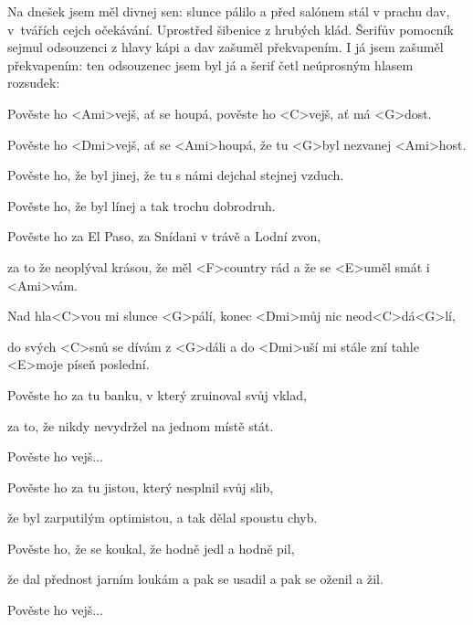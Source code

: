 

Na dnešek jsem měl divnej sen: slunce pálilo a před salónem stál v prachu dav, v~tvářích cejch očekávání.
Uprostřed šibenice z hrubých klád.
Šerifův pomocník sejmul odsouzenci z hlavy kápi a dav zašuměl překvapením.
I já jsem zašuměl překvapením: ten odsouzenec jsem byl já
a šerif četl neúprosným hlasem rozsudek:

\zs
Pověste ho <Ami>vejš, ať se houpá,
pověste ho <C>vejš, ať má <G>dost.

Pověste ho <Dmi>vejš, ať se <Ami>houpá,
že tu <G>byl nezvanej <Ami>host.
\ks

\zs
Pověste ho, že byl jinej,
že tu s námi dejchal stejnej vzduch.

Pověste ho, že byl línej
a tak trochu dobrodruh.
\ks

\zs
Pověste ho za El Paso,
za Snídani v trávě a Lodní zvon,

za to že neoplýval krásou,
že měl <F>country rád a že se <E>uměl smát i <Ami>vám.
\ks

\zr
Nad hla<C>vou mi slunce <G>pálí,
konec <Dmi>můj nic neod<C>dá<G>lí,

do svých <C>snů se dívám z <G>dáli
a do <Dmi>uší mi stále zní tahle <E>moje píseň poslední.
\kr

\zs
Pověste ho za tu banku,
v který zruinoval svůj vklad,

za to, že nikdy nevydržel
na jednom místě stát.
\ks

\zr \kr

\zs
Pověste ho vejš...
\ks

\zs
Pověste ho za tu jistou,
který nesplnil svůj slib,

že byl zarputilým optimistou,
a tak dělal spoustu chyb.
\ks

\zs
Pověste ho, že se koukal,
že hodně jedl a hodně pil,

že dal přednost jarním loukám
a pak se usadil a pak se oženil
a žil.
\ks

\zs
Pověste ho vejš...
\ks
\kp
